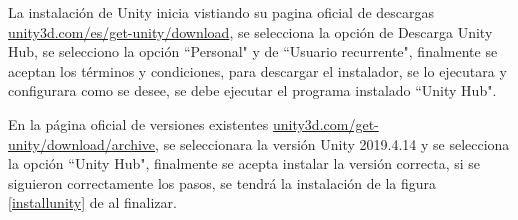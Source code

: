 La instalación de Unity inicia vistiando su pagina oficial de descargas  \href{https://unity3d.com/es/get-unity/download}{unity3d.com/es/get-unity/download}, se selecciona la opción de Descarga Unity Hub, se selecciono la opción ``Personal" y de ``Usuario recurrente", finalmente se aceptan los términos y condiciones, para descargar el instalador, se lo ejecutara y configurara como se desee, se debe ejecutar el programa instalado ``Unity Hub".  

En la página oficial de versiones existentes \href{https://unity3d.com/get-unity/download/archive}{unity3d.com/get-unity/download/archive}, se seleccionara la versión Unity 2019.4.14 y se selecciona la opción ``Unity Hub", finalmente se acepta instalar la versión correcta, si se siguieron correctamente los pasos, se tendrá la instalación de la figura \ref{installunity} de  al finalizar.

